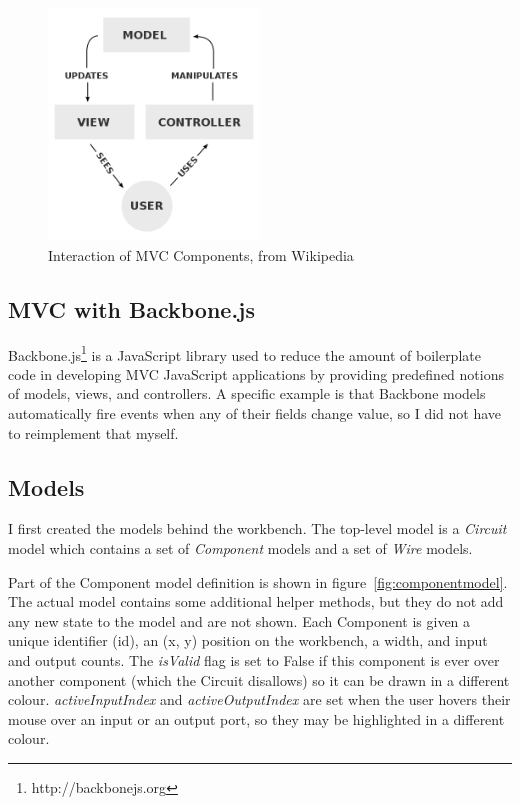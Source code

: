 \begin{figure}[H]
	\centering
	\includegraphics[width=0.5\textwidth]{mvc.png}
	\caption{Interaction of MVC Components, from Wikipedia\cite{Wikipedia: MVC Image}}
	\label{fig:mvc}
\end{figure}

\subsection{MVC with Backbone.js}
Backbone.js\footnote{http://backbonejs.org} is a JavaScript library used to reduce the amount of boilerplate code in developing MVC JavaScript applications by providing predefined notions of models, views, and controllers. A specific example is that Backbone models automatically fire events when any of their fields change value, so I did not have to reimplement that myself.

\subsection{Models}
I first created the models behind the workbench. The top-level model is a \textit{Circuit} model which contains a set of \textit{Component} models and a set of \textit{Wire} models.

Part of the Component model definition is shown in figure~\ref{fig:componentmodel}. The actual model contains some additional helper methods, but they do not add any new state to the model and are not shown. Each Component is given a unique identifier (id), an (x, y) position on the workbench, a width, and input and output counts. The \textit{isValid} flag is set to False if this component is ever over another component (which the Circuit disallows) so it can be drawn in a different colour. \textit{activeInputIndex} and \textit{activeOutputIndex} are set when the user hovers their mouse over an input or an output port, so they may be highlighted in a different colour.


